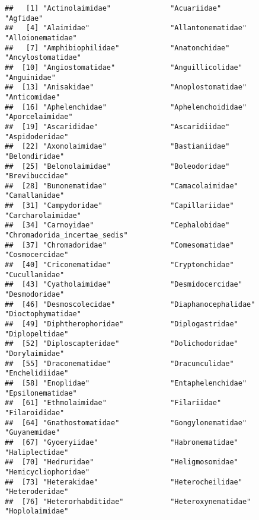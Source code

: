 \documentclass[
]{article}
\begin{document}
\begin{verbatim}
##   [1] "Actinolaimidae"              "Acuariidae"                  "Agfidae"                    
##   [4] "Alaimidae"                   "Allantonematidae"            "Alloionematidae"            
##   [7] "Amphibiophilidae"            "Anatonchidae"                "Ancylostomatidae"           
##  [10] "Angiostomatidae"             "Anguillicolidae"             "Anguinidae"                 
##  [13] "Anisakidae"                  "Anoplostomatidae"            "Anticomidae"                
##  [16] "Aphelenchidae"               "Aphelenchoididae"            "Aporcelaimidae"             
##  [19] "Ascarididae"                 "Ascaridiidae"                "Aspidoderidae"              
##  [22] "Axonolaimidae"               "Bastianiidae"                "Belondiridae"               
##  [25] "Belonolaimidae"              "Boleodoridae"                "Brevibuccidae"              
##  [28] "Bunonematidae"               "Camacolaimidae"              "Camallanidae"               
##  [31] "Campydoridae"                "Capillariidae"               "Carcharolaimidae"           
##  [34] "Carnoyidae"                  "Cephalobidae"                "Chromadorida_incertae_sedis"
##  [37] "Chromadoridae"               "Comesomatidae"               "Cosmocercidae"              
##  [40] "Criconematidae"              "Cryptonchidae"               "Cucullanidae"               
##  [43] "Cyatholaimidae"              "Desmidocercidae"             "Desmodoridae"               
##  [46] "Desmoscolecidae"             "Diaphanocephalidae"          "Dioctophymatidae"           
##  [49] "Diphtherophoridae"           "Diplogastridae"              "Diplopeltidae"              
##  [52] "Diploscapteridae"            "Dolichodoridae"              "Dorylaimidae"               
##  [55] "Draconematidae"              "Dracunculidae"               "Enchelidiidae"              
##  [58] "Enoplidae"                   "Entaphelenchidae"            "Epsilonematidae"            
##  [61] "Ethmolaimidae"               "Filariidae"                  "Filaroididae"               
##  [64] "Gnathostomatidae"            "Gongylonematidae"            "Guyanemidae"                
##  [67] "Gyoeryiidae"                 "Habronematidae"              "Haliplectidae"              
##  [70] "Hedruridae"                  "Heligmosomidae"              "Hemicycliophoridae"         
##  [73] "Heterakidae"                 "Heterocheilidae"             "Heteroderidae"              
##  [76] "Heterorhabditidae"           "Heteroxynematidae"           "Hoplolaimidae"              

\end{verbatim}
\end{document}
